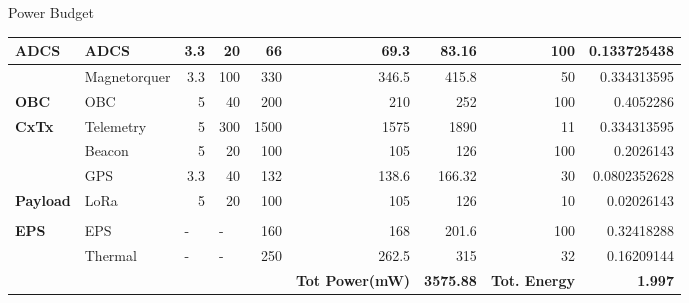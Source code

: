 \documentclass[aspectratio=169]{beamer}
\begin{document}
\begin{frame}{Power Budget}
\begin{table}[]
\begin{adjustbox}{width=\columnwidth,center}
\begin{tabular}{|l|l|r|r|r|r|r|r|r|}
\rowcolor[HTML]{FFE6DD} 
\textbf{ADCS} &
  ADCS &
  3.3 &
  20 &
  66 &
  69.3 &
  83.16 &
  100 &
  0.133725438 \\ \hline
\rowcolor[HTML]{FFE6DD} 
 &
  Magnetorquer &
  3.3 &
  100 &
  330 &
  346.5 &
  415.8 &
  50 &
  0.334313595 \\ \hline
\rowcolor[HTML]{FFE6DD} 
\textbf{OBC} &
  OBC &
  5 &
  40 &
  200 &
  210 &
  252 &
  100 &
  0.4052286 \\ \hline
\rowcolor[HTML]{FFE6DD} 
\textbf{CxTx} &
  Telemetry &
  5 &
  300 &
  1500 &
  1575 &
  1890 &
  11 &
  0.334313595 \\ \hline
\rowcolor[HTML]{FFE6DD} 
 &
  Beacon &
  5 &
  20 &
  100 &
  105 &
  126 &
  100 &
  0.2026143 \\ \hline
\rowcolor[HTML]{FFE6DD} 
 &
  GPS &
  3.3 &
  40 &
  132 &
  138.6 &
  166.32 &
  30 &
  0.0802352628 \\ \hline
\rowcolor[HTML]{FFE6DD} 
\textbf{Payload} &
  LoRa &
  5 &
  20 &
  100 &
  105 &
  126 &
  10 &
  0.02026143 \\ \hline
\rowcolor[HTML]{FFE6DD} 
 &
   &
  \multicolumn{1}{l|}{\cellcolor[HTML]{FFE6DD}} &
  \multicolumn{1}{l|}{\cellcolor[HTML]{FFE6DD}} &
  \multicolumn{1}{l|}{\cellcolor[HTML]{FFE6DD}} &
  \multicolumn{1}{l|}{\cellcolor[HTML]{FFE6DD}} &
  \multicolumn{1}{l|}{\cellcolor[HTML]{FFE6DD}} &
  \multicolumn{1}{l|}{\cellcolor[HTML]{FFE6DD}} &
  \multicolumn{1}{l|}{\cellcolor[HTML]{FFE6DD}} \\ \hline
\rowcolor[HTML]{FFE6DD} 
\textbf{EPS} &
  EPS &
  \multicolumn{1}{l|}{\cellcolor[HTML]{FFE6DD}-} &
  \multicolumn{1}{l|}{\cellcolor[HTML]{FFE6DD}-} &
  160 &
  168 &
  201.6 &
  100 &
  0.32418288 \\ \hline
\rowcolor[HTML]{FFE6DD} 
 &
  Thermal &
  \multicolumn{1}{l|}{\cellcolor[HTML]{FFE6DD}-} &
  \multicolumn{1}{l|}{\cellcolor[HTML]{FFE6DD}-} &
  250 &
  262.5 &
  315 &
  32 &
  0.16209144 \\ \hline
\rowcolor[HTML]{FFE6DD} 
 &
   &
  \multicolumn{1}{l|}{\cellcolor[HTML]{FFE6DD}} &
  \multicolumn{1}{l|}{\cellcolor[HTML]{FFE6DD}} &
  \multicolumn{1}{l|}{\cellcolor[HTML]{FFE6DD}} &
  \multicolumn{1}{l|}{\cellcolor[HTML]{FFE6DD}\textbf{Tot Power(mW)}} &
  \textbf{3575.88} &
  \multicolumn{1}{l|}{\cellcolor[HTML]{FFE6DD}\textbf{Tot. Energy}} &
  \textbf{1.997} \\ \hline
\end{tabular}
\end{adjustbox}
\end{table}


    \end{frame}
\end{document}
